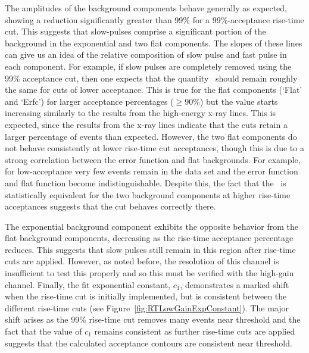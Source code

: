 The amplitudes of the background components behave generally as expected, showing a reduction significantly greater than 99\% for a 99\%-acceptance rise-time cut.  This suggests that slow-pulses comprise a significant portion of the background in the exponential and two flat components.  The slopes of these lines can give us an idea of the relative composition of slow pulse and fast pulse in each component.  For example, if slow pulses are completely removed using the 99\% acceptance cut, then one expects that the quantity \releff~should remain roughly the same for cuts of lower acceptance. This is true for the flat components (`Flat' and `Erfc') for larger acceptance percentages ($\ge90$\%) but the value starts increasing similarly to the results from the high-energy x-ray lines.  This is expected, since the results from the x-ray lines indicate that the cuts retain a larger percentage of events than expected.  However, the two flat components do not behave consistently at lower rise-time cut acceptances, though this is due to a strong correlation between the error function and flat backgrounds.  For example, for low-acceptance very few events remain in the data set and the error function and flat function become indistinguishable.  Despite this, the fact that the \releff~is statistically equivalent for the two background components at higher rise-time acceptances suggests that the cut behaves correctly there.  

The exponential background component exhibits the opposite behavior from the flat background components, decreasing as the rise-time acceptance percentage reduces.  This suggests that slow pulses still remain in this region after rise-time cuts are applied.  However, as noted before, the resolution of this channel is insufficient to test this properly and so this must be verified with the high-gain channel.  Finally, the fit exponential constant, $c_{1}$, demonstrates a marked shift when the rise-time cut is initially implemented, but is consistent between the different rise-time cuts (see Figure~\ref{fig:RTLowGainExpConstant}).  The major shift arises as the 99\% rise-time cut removes many events near threshold and the fact that the value of $c_{1}$ remains consistent as further rise-time cuts are applied suggests that the calculated acceptance contours are consistent near threshold.  

